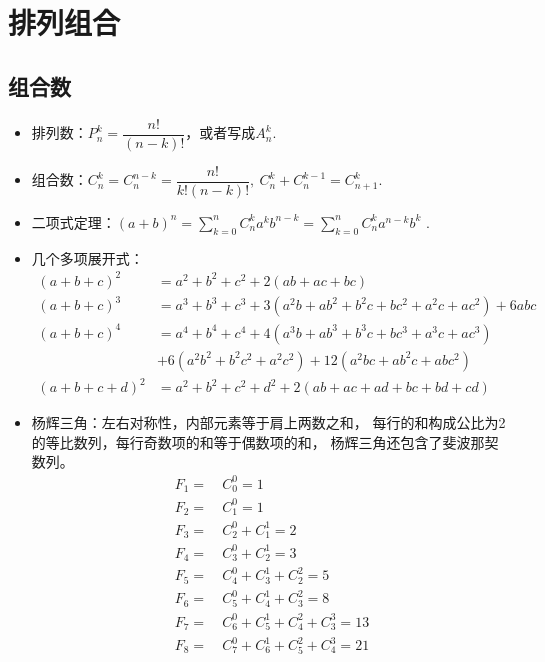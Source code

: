 \chapter{排列组合}

\section{组合数}
\begin{itemize}[leftmargin=\inteval{\myitemleftmargin}pt,itemsep=
   \inteval{\myitemitempsep}pt,topsep=\inteval{\myitemtopsep}pt]
\item 排列数：$ P_n^k=\dfrac{n!}{(n-k)!} $，或者写成$ A_n^k $. 
\item 组合数：$ C_n^k=C_n^{n-k}=\dfrac{n!}{k!(n-k)!},\ 
C_n^k+C_n^{k-1}=C_{n+1}^k $. 
\item 二项式定理：$ (a+b)^n=\sum\limits_{k=0}^nC_n^ka^kb^{n-k}=
\sum\limits_{k=0}^nC_n^ka^{n-k}b^k $ .
\item 几个多项展开式：
\begin{align*}
    (a+b+c)^2 &=a^2+b^2+c^2+2(ab+ac+bc) \\
    (a+b+c)^3 &=a^3+b^3+c^3+3(a^2b+ab^2+b^2c+bc^2+a^2c+ac^2)+6abc \\
    (a+b+c)^4 &=a^4+b^4+c^4+4(a^3b+ab^3+b^3c+bc^3+a^3c+ac^3) \\
    &+6(a^2b^2+b^2c^2+a^2c^2)+12(a^2bc+ab^2c+abc^2) \\
    (a+b+c+d)^2 &=a^2+b^2+c^2+d^2+2(ab+ac+ad+bc+bd+cd) 
\end{align*}
\item 杨辉三角：左右对称性，内部元素等于肩上两数之和，
每行的和构成公比为2的等比数列，每行奇数项的和等于偶数项的和，
杨辉三角还包含了斐波那契数列。
\begin{align*}
    F_1=&\  C_0^0=1 \\
    F_2=&\  C_1^0=1 \\
    F_3=&\  C_2^0+C_1^1=2 \\
    F_4=&\  C_3^0+C_2^1=3 \\
    F_5=&\  C_4^0+C_3^1+C_2^2=5 \\
    F_6=&\  C_5^0+C_4^1+C_3^2=8 \\
    F_7=&\  C_6^0+C_5^1+C_4^2+C_3^3=13 \\
    F_8=&\  C_7^0+C_6^1+C_5^2+C_4^3=21 \\ 

\end{align*}
\end{itemize}
